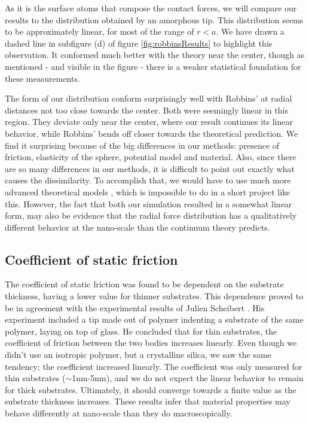 \documentclass[twoside,english]{uiofysmaster}
\begin{document}
As it is the surface atoms that compose the contact forces, we will compare our results to the distribution obtained by an amorphous tip.
This distribution seems to be approximately linear, for most of the range of $r<a$. 
We have drawn a dashed line in subfigure (d) of figure \ref{fig:robbinsResults} to highlight this observation. 
It conformed much better with the theory near the center, though as mentioned - and visible in the figure - there is a weaker statistical foundation for these measurements.

The form of our distribution conform surprisingly well with Robbins' at radial distances not too close towards the center. 
Both were seemingly linear in this region. 
They deviate only near the center, where our result continues its linear behavior, while Robbins' bends off closer towards the theoretical prediction.
We find it surprising because of the big differences in our methods: presence of friction, elasticity of the sphere, potential model and material. 
Also, since there are so many differences in our methods, it is difficult to point out exactly what causes the dissimilarity. 
To accomplish that, we would have to use much more advanced theoretical models \cite{Johnson1985}, which is impossible to do in a short project like this. 
However, the fact that both our simulation resulted in a somewhat linear form, may also be evidence that the radial force distribution has a qualitatively different behavior at the nano-scale than the continuum theory predicts.


 





\subsection{Coefficient of static friction}
The coefficient of static friction was found to be dependent on the substrate thickness, having a lower value for thinner substrates. 
This dependence proved to be in agreement with the experimental results of Julien Scheibert \cite{Scheibert2017}. 
His experiment included a tip made out of polymer indenting a substrate of the same polymer, laying on top of glass.
He concluded that for thin substrates, the coefficient of friction between the two bodies increases linearly. 
Even though we didn't use an isotropic polymer, but a crystalline silica, we saw the same tendency; 
the coefficient increased linearly. 
The coefficient was only measured for thin substrates ($\sim$1nm-5nm), and we do not expect the linear behavior to remain for thick substrates. 
Ultimately, it should converge towards a finite value as the substrate thickness increases.
These results infer that material properties may behave differently at nano-scale than they do macroscopically. 
\end{document}

